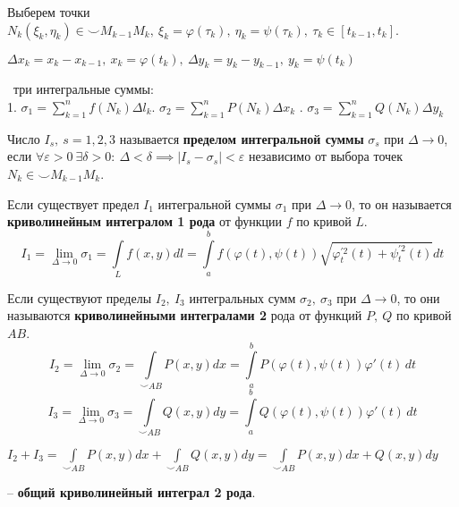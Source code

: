 Выберем точки $N_k(\xi_k, \eta_k) \in \smile M_{k-1}M_k,~\xi_k=\varphi(\tau_k),~\eta_k=\psi(\tau_k),~\tau_k\in [t_{k-1},t_k]$.

$\Delta x_k = x_k - x_{k-1},~x_k = \varphi(t_k),~\Delta y_k = y_k - y_{k-1},~y_k = \psi(t_k)$

\faEye \ три интегральные суммы:\\
1. $\sigma_1=\displaystyle\sum_{k=1}^n f(N_k)\Delta l_k$. $\sigma_2=\displaystyle\sum_{k=1}^n P(N_k)\Delta x_k$  . $\sigma_3=\displaystyle\sum_{k=1}^n Q(N_k)\Delta y_k$

Число $I_s,~s=1,2,3$ называется \textbf{пределом интегральной суммы} $\sigma_s$ при $\Delta \rightarrow 0$, если $\forall\varepsilon>0~\exists\delta>0:~\Delta<\delta\implies|I_s-\sigma_s|<\varepsilon$ независимо от выбора точек $N_k\in\smile M_{k-1}M_k$.

Если существует предел $I_1$ интегральной суммы $\sigma_1$ при $\Delta \rightarrow 0$, то он называется \textbf{криволинейным интегралом 1 рода} от функции $f$ по кривой $L$.
$$I_1=\displaystyle\lim_{\Delta\to 0}\sigma_1
= \int\limits_{L}f(x,y)dl 
=\int\limits_{a}^{b} f(\varphi(t), \psi(t)) \sqrt{ \varphi_t^{'2}(t) + \psi_t^{'2}(t) } dt $$

Если существуют пределы $I_2,~I_3$ интегральных сумм $\sigma_2,~\sigma_3$ при $\Delta \rightarrow 0$, то они называются \textbf{криволинейными интегралами 2} рода от функций $P,~Q$ по кривой $AB$.
$$I_2=\displaystyle\lim_{\Delta\to 0}\sigma_2= \int\limits_{\smile AB}P(x,y)dx  = \int\limits_a^b P(\varphi(t), \psi(t)) \varphi'(t) \,dt$$
$$I_3=\displaystyle\lim_{\Delta\to 0}\sigma_3= \int\limits_{\smile AB}Q(x,y)dy =\int\limits_a^b Q(\varphi(t), \psi(t)) \varphi'(t) \,dt$$

$I_2+I_3=\int\limits_{\smile AB}P(x,y)dx+\int\limits_{\smile AB}Q(x,y)dy = \int\limits_{\smile AB}P(x,y)dx+Q(x,y)dy$ 

-- \textbf{общий криволинейный интеграл 2 рода}.


